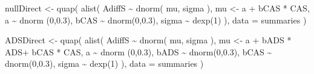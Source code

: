 \documentclass[
  10pt,
  dvipsnames,enabledeprecatedfontcommands]{scrartcl}
\newenvironment{Shaded}{\begin{snugshade}}{\end{snugshade}}
\newcommand{\AttributeTok}[1]{\textcolor[rgb]{0.77,0.63,0.00}{#1}}
\newcommand{\DecValTok}[1]{\textcolor[rgb]{0.00,0.00,0.81}{#1}}
\newcommand{\FloatTok}[1]{\textcolor[rgb]{0.00,0.00,0.81}{#1}}
\newcommand{\FunctionTok}[1]{\textcolor[rgb]{0.00,0.00,0.00}{#1}}
\newcommand{\NormalTok}[1]{#1}
\newcommand{\OtherTok}[1]{\textcolor[rgb]{0.56,0.35,0.01}{#1}}
\newcommand{\SpecialCharTok}[1]{\textcolor[rgb]{0.00,0.00,0.00}{#1}}
\begin{document}
\begin{Shaded}
\begin{Highlighting}[]
\NormalTok{nullDirect }\OtherTok{\textless{}{-}} \FunctionTok{quap}\NormalTok{(}
  \FunctionTok{alist}\NormalTok{(}
\NormalTok{    AdiffS }\SpecialCharTok{\textasciitilde{}} \FunctionTok{dnorm}\NormalTok{( mu, sigma ),}
\NormalTok{    mu }\OtherTok{\textless{}{-}}\NormalTok{ a }\SpecialCharTok{+}\NormalTok{ bCAS }\SpecialCharTok{*}\NormalTok{ CAS,}
\NormalTok{    a }\SpecialCharTok{\textasciitilde{}} \FunctionTok{dnorm}\NormalTok{ (}\DecValTok{0}\NormalTok{,}\FloatTok{0.3}\NormalTok{),}
\NormalTok{    bCAS }\SpecialCharTok{\textasciitilde{}} \FunctionTok{dnorm}\NormalTok{(}\DecValTok{0}\NormalTok{,}\FloatTok{0.3}\NormalTok{),}
\NormalTok{    sigma  }\SpecialCharTok{\textasciitilde{}} \FunctionTok{dexp}\NormalTok{(}\DecValTok{1}\NormalTok{)}
\NormalTok{  ), }
  \AttributeTok{data =}\NormalTok{ summaries  }
\NormalTok{)}

\NormalTok{ADSDirect }\OtherTok{\textless{}{-}} \FunctionTok{quap}\NormalTok{(}
  \FunctionTok{alist}\NormalTok{(}
\NormalTok{    AdiffS }\SpecialCharTok{\textasciitilde{}} \FunctionTok{dnorm}\NormalTok{( mu, sigma ),}
\NormalTok{    mu }\OtherTok{\textless{}{-}}\NormalTok{  a }\SpecialCharTok{+}\NormalTok{ bADS }\SpecialCharTok{*}\NormalTok{ ADS}\SpecialCharTok{+}\NormalTok{ bCAS }\SpecialCharTok{*}\NormalTok{ CAS,}
\NormalTok{    a }\SpecialCharTok{\textasciitilde{}} \FunctionTok{dnorm}\NormalTok{ (}\DecValTok{0}\NormalTok{,}\FloatTok{0.3}\NormalTok{),}
\NormalTok{    bADS }\SpecialCharTok{\textasciitilde{}} \FunctionTok{dnorm}\NormalTok{(}\DecValTok{0}\NormalTok{,}\FloatTok{0.3}\NormalTok{),}
\NormalTok{    bCAS }\SpecialCharTok{\textasciitilde{}} \FunctionTok{dnorm}\NormalTok{(}\DecValTok{0}\NormalTok{,}\FloatTok{0.3}\NormalTok{),}
\NormalTok{    sigma  }\SpecialCharTok{\textasciitilde{}} \FunctionTok{dexp}\NormalTok{(}\DecValTok{1}\NormalTok{)}
\NormalTok{  ), }
  \AttributeTok{data =}\NormalTok{ summaries}
\NormalTok{)}


\end{Highlighting}
\end{Shaded}
\end{document}
